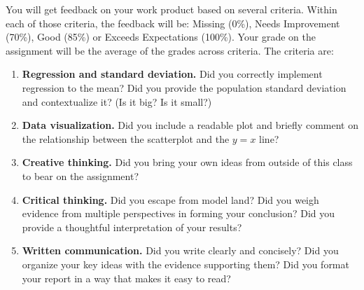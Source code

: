 \documentclass{article}
\begin{document}
      You will get feedback on your work product based on several criteria. Within each of those criteria, the feedback will be: Missing (0\%), Needs Improvement (70\%), Good (85\%) or Exceeds Expectations (100\%). Your grade on the assignment will be the average of the grades across criteria. The criteria are:
      \begin{enumerate}
        \item {\bf Regression and standard deviation.} Did you correctly implement regression to the mean? Did you provide the population standard deviation and contextualize it? (Is it big? Is it small?)
        \item {\bf Data visualization.} Did you include a readable plot and briefly comment on the relationship between the scatterplot and the $y = x$ line?
        \item {\bf Creative thinking.} Did you bring your own ideas from outside of this class to bear on the assignment?
        \item {\bf Critical thinking.} Did you escape from model land? Did you weigh evidence from multiple perspectives in forming your conclusion? Did you provide a thoughtful interpretation of your results?
        \item {\bf Written communication.} Did you write clearly and concisely? Did you organize your key ideas with the evidence supporting them? Did you format your report in a way that makes it easy to read?
      \end{enumerate}
\end{document}
